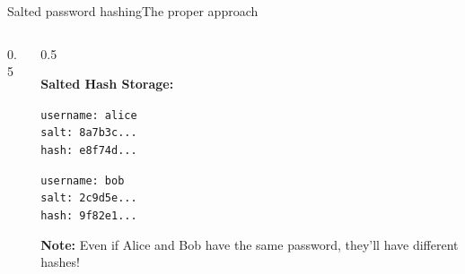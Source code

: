 \ifdefined\PRESENTATION\else\PassOptionsToClass{handout}{beamer}\fi\documentclass[aspectratio=169, lualatex]{beamer}
\begin{document}
\begin{frame}{Salted password hashing}{The proper approach}
	\begin{columns}[c]
		\begin{column}{0.5\textwidth}
		\end{column}
		\begin{column}{0.5\textwidth}
			\begin{tcolorbox}[colback=black!5!white,colframe=ciphergray]
				\small
				\textbf{Salted Hash Storage:}

				\vspace{0.2cm}

				\texttt{username: alice}\\
				\texttt{salt: 8a7b3c...}\\
				\texttt{hash: e8f74d...}

				\vspace{0.2cm}

				\texttt{username: bob}\\
				\texttt{salt: 2c9d5e...}\\
				\texttt{hash: 9f82e1...}

				\vspace{0.3cm}

				\textcolor{cipherprimary}{\textbf{Note:} \scriptsize Even if Alice and Bob have the same password, they'll have different hashes!}
			\end{tcolorbox}
		\end{column}
	\end{columns}
\end{frame}
\end{document}
